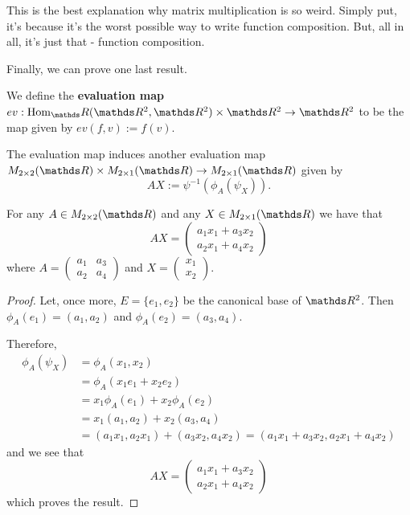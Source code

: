 This is the best explanation why matrix multiplication is so weird. Simply put, it's because it's the worst possible way to write function composition. But, all in all, it's just that - function composition.

Finally, we can prove one last result.

\begin{df}
	We define the \textbf{evaluation map} $ev:\hom_\R(\R^2,\R^2)\times \R^2\to \R^2$ to be the map given by $ev(f,v):=f(v)$.
\end{df}

\begin{df}
	The evaluation map induces another evaluation map $M_{2\times 2}(\R)\times M_{2\times 1}(\R)\to M_{2\times 1}(\R)$ given by 
	\[AX:=\psi^{-1}(\phi_A(\psi_X)).\]
\end{df}

\begin{lemma}
	For any $A\in M_{2\times 2}(\R)$ and any $X\in M_{2\times 1}(\R)$ we have that \[AX=\begin{pmatrix}
	a_1x_1+a_3x_2\\
	a_2x_1+a_4x_2
	\end{pmatrix}\]where $A=\begin{pmatrix}
	a_1&a_3\\
	a_2&a_4
	\end{pmatrix}$ and $X=\begin{pmatrix}
	x_1\\x_2
	\end{pmatrix}$.
\end{lemma}
\begin{proof}
	Let, once more, $E=\{e_1,e_2\}$ be the canonical base of $\R^2$. Then $\phi_A(e_1)=(a_1,a_2)$ and $\phi_A(e_2)=(a_3,a_4)$.
	
	Therefore,
	\begin{align*}
		\phi_A(\psi_X)&=\phi_A(x_1,x_2)\\
		&=\phi_A(x_1e_1+x_2e_2)\\
		&=x_1\phi_A(e_1)+x_2\phi_A(e_2)\\
		&=x_1(a_1,a_2)+x_2(a_3,a_4)\\
		&=(a_1x_1,a_2x_1)+(a_3x_2,a_4x_2)=(a_1x_1+a_3x_2,a_2x_1+a_4x_2)
	\end{align*}and we see that \[AX=\begin{pmatrix}
	a_1x_1+a_3x_2\\
	a_2x_1+a_4x_2
	\end{pmatrix}\]which proves the result.
\end{proof}

